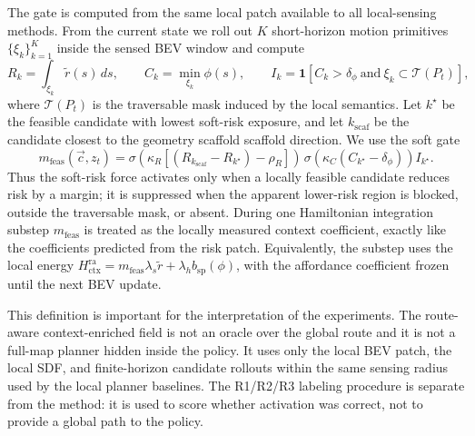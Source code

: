 The gate is computed from the same local patch available to all
local-sensing methods. From the current state we roll out $K$ short-horizon
motion primitives $\{\xi_k\}_{k=1}^K$ inside the sensed BEV window and compute
\begin{equation}
R_k=\int_{\xi_k}\tilde r(s)\,ds,\qquad
C_k=\min_{\xi_k}\phi(s),\qquad
I_k=\mathbf{1}[C_k>\delta_\phi\ \text{and}\ \xi_k\subset\mathcal{T}(P_t)],
\end{equation}
where $\mathcal{T}(P_t)$ is the traversable mask induced by the local
semantics. Let $k^\star$ be the feasible candidate with lowest soft-risk
exposure, and let $k_{\mathrm{scaf}}$ be the candidate closest to the geometry scaffold
scaffold direction. We use the soft gate
\begin{equation}
m_{\mathrm{feas}}(\vec c,z_t)
=
\sigma\!\left(\kappa_R
\left[(R_{k_{\mathrm{scaf}}}-R_{k^\star})-\rho_R\right]\right)
\,
\sigma\!\left(\kappa_C(C_{k^\star}-\delta_\phi)\right)
I_{k^\star}.
\label{eq:method:route_gate}
\end{equation}
Thus the soft-risk force activates only when a locally feasible candidate
reduces risk by a margin; it is suppressed when the apparent lower-risk
region is blocked, outside the traversable mask, or absent. During one
Hamiltonian integration substep $m_{\mathrm{feas}}$ is treated as the
locally measured context coefficient, exactly like the coefficients
predicted from the risk patch. Equivalently, the substep uses the local
energy $H_{\mathrm{ctx}}^{\mathrm{ra}}=
m_{\mathrm{feas}}\lambda_s\tilde r+
\lambda_h b_{\mathrm{sp}}(\phi)$, with the affordance coefficient frozen
until the next BEV update.

This definition is important for the interpretation of the experiments.
The route-aware context-enriched field is not an oracle over the global route and it is not a
full-map planner hidden inside the policy. It uses only the local BEV patch,
the local SDF, and finite-horizon candidate rollouts within the same sensing
radius used by the local planner baselines. The R1/R2/R3 labeling procedure is
separate from the method: it is used to score whether activation was correct,
not to provide a global path to the policy.

